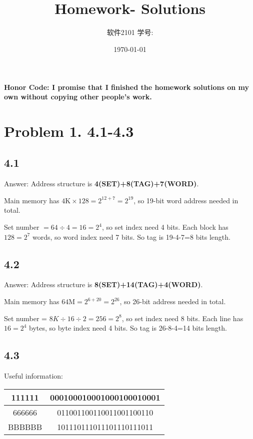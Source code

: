 \documentclass[11pt]{article}  %
\title{\vspace{-4cm}\CourseCodeName \space
        \Session \protect\\  Homework-\textbf{\Homework} Solutions}
\author{软件2101 \Name \space 学号: \SID}
\date{\today}
\begin{document}
\maketitle

\textbf{Honor Code: I promise that I finished the homework solutions on my own without copying other people's 
    work.}

\section*{Problem 1. 4.1-4.3}

\subsection*{4.1}

Answer: Address structure is \textbf{4(SET)+8(TAG)+7(WORD)}.

Main memory has $4\text{K}\times 128 = 2^{12+7} = 2^{19}$, so 19-bit word address needed in total.

Set number $= 64\div 4 = 16 = 2^4$, so set index need 4 bits. Each block has $128 = 2^{7}$ words, so word index need 7 bits.
So tag is 19-4-7=8 bits length.

\subsection*{4.2}

Answer: Address structure is \textbf{8(SET)+14(TAG)+4(WORD)}.

Main memory has $64\text{M} = 2^{6+20} = 2^{26}$, so 26-bit address needed in total.

Set number = $8K  \div 16 \div 2 = 256 = 2^8$, so set index need 8 bits. Each line has $16 = 2^{4}$ bytes, 
so byte index need 4 bits. So tag is 26-8-4=14 bits length.

\subsection*{4.3}

Useful information:
\begin{table}[H]
    \begin{tabular}{|c|c|}
        \hline
        111111   & 000100010001000100010001 \\ \hline
        666666   & 011001100110011001100110 \\ \hline
        BBBBBB   & 101110111011101110111011 \\ \hline
    \end{tabular}
\end{table}
\end{document}
